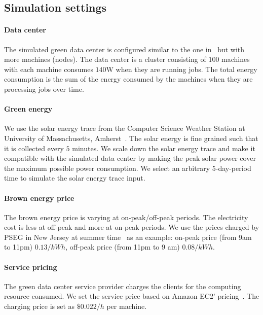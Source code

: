 \documentclass[conference]{IEEEtran}
\begin{document}
\subsection{Simulation settings}

\paragraph*{Data center}

The simulated green data center is configured similar to the one in~\cite{GoiriL11} but with more machines (nodes). The data center is a cluster consisting of $100$ machines with each machine consumes $140$W when they are running jobs. The total energy consumption is the sum of the energy consumed by the machines when they are processing jobs over time.

\paragraph*{Green energy}

We use the solar energy trace from the Computer Science Weather Station at University of Massachusetts, Amherst~\cite{solarTrace}. The solar energy is fine grained such that it is collected every $5$ minutes. We scale down the solar energy trace and make it compatible with the simulated data center by making the peak solar power cover the maximum possible power consumption. We select an arbitrary $5$-day-period time to simulate the solar energy trace input.









\paragraph*{Brown energy price}

The brown energy price is varying at on-peak/off-peak periods. The electricity cost is less at off-peak and more at on-peak periods. We use the prices charged by PSEG in New Jersey at summer time~\cite{GoiriL11} as an example: on-peak price (from 9am to 11pm) $0.13/kWh$, off-peak price (from 11pm to 9 am) $0.08/kWh$.

\paragraph*{Service pricing}

The green data center service provider charges the clients for the computing resource consumed. We set the service price based on Amazon EC2' pricing~\cite{amazonprice}. The charging price is set as $\$0.022/h$ per machine.
\end{document}

